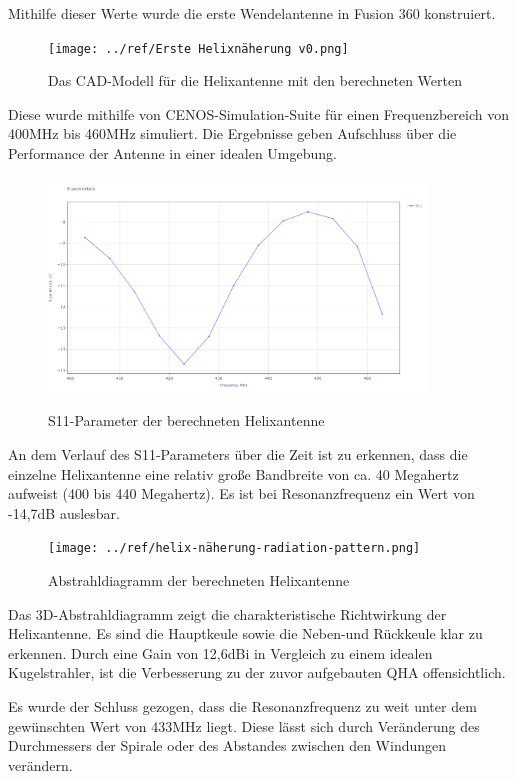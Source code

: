 Mithilfe dieser Werte wurde die erste Wendelantenne in Fusion 360 konstruiert. 

\begin{figure}[h!]
	\centering
	\texttt{[image: ../ref/Erste Helixnäherung v0.png]}
	\label{fig:ersteHelixnäherung}
	\caption{Das CAD-Modell für die Helixantenne mit den berechneten Werten}
\end{figure}

Diese wurde mithilfe von CENOS-Simulation-Suite für einen Frequenzbereich von 400MHz bis 460MHz simuliert. Die Ergebnisse geben Aufschluss über die Performance der Antenne in einer idealen Umgebung.

\begin{figure}[H]
	\centering
	\includegraphics[width=10cm]{../ref/helix-naherung-S11.png}
	\label{fig:ersteHelixnäherung-S11}
	\caption{S11-Parameter der berechneten Helixantenne}
\end{figure}

An dem Verlauf des S11-Parameters über die Zeit ist zu erkennen, dass die einzelne Helixantenne eine relativ große Bandbreite von ca. 40 Megahertz aufweist (400 bis 440 Megahertz). Es ist bei Resonanzfrequenz ein Wert von -14,7dB auslesbar. 

\begin{figure}[H]
	\centering
	\texttt{[image: ../ref/helix-näherung-radiation-pattern.png]}
	\label{fig:ersteHelixnäherung-abstrahldiagramm}
	\caption{Abstrahldiagramm der berechneten Helixantenne}
\end{figure}

Das 3D-Abstrahldiagramm zeigt die charakteristische Richtwirkung der Helixantenne. Es sind die Hauptkeule sowie die Neben-und Rückkeule klar zu erkennen. Durch eine Gain von 12,6dBi in Vergleich zu einem idealen Kugelstrahler, ist die Verbesserung zu der zuvor aufgebauten QHA offensichtlich.

Es wurde der Schluss gezogen, dass die Resonanzfrequenz zu weit unter dem gewünschten Wert von 433MHz liegt. Diese lässt sich durch Veränderung des Durchmessers der Spirale oder des Abstandes zwischen den Windungen verändern.


